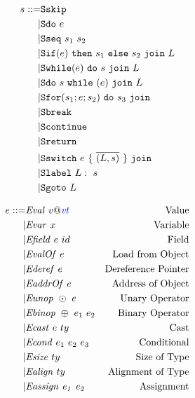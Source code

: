 \documentclass{llncs}
\begin{document}
\begin{figure}
  \begin{subfigure}[t]{0.3\textwidth}
    \[\begin{aligned}
    s ::= & \mathtt{Sskip} \\
    | & \mathtt{Sdo} ~ e \\
    | & \mathtt{Sseq} ~ s_1 ~ s_2 \\
    | & \mathtt{Sif}(e) ~ \mathtt{then} ~ s_1 ~ \mathtt{else} ~ s_2 ~ \mathtt{join} ~ L \\
    | & \mathtt{Swhile}(e) ~ \mathtt{do} ~ s ~ \mathtt{join} ~ L \\
    | & \mathtt{Sdo} ~ s ~ \mathtt{while} ~ (e) ~ \mathtt{join} ~ L \\
    | & \mathtt{Sfor}(s_1; e; s_2) ~ \mathtt{do} ~ s_3 ~ \mathtt{join} ~ \\
    | & \mathtt{Sbreak} \\
    | & \mathtt{Scontinue} \\
    | & \mathtt{Sreturn} ~ \\
    | & \mathtt{Sswitch} ~ e ~ \{ ~ \overline{(L,s)} ~ \} ~ \mathtt{join} ~ \\
    | & \mathtt{Slabel} ~ L: ~ s \\
    | & \mathtt{Sgoto} ~ L \\    
    \end{aligned}\]
  \end{subfigure}
  \begin{subfigure}[t]{0.69\textwidth}
    \[\begin{aligned}
    \expr ::= & \val{v}{\vt} & \textnormal{Value} \\
    | & \var{x} & \textnormal{Variable} \\
    | & \field{\expr}{id} & \textnormal{Field} \\
    | & \valof{\expr} & \textnormal{Load from Object} \\
    | & \deref{\expr} & \textnormal{Dereference Pointer} \\
    | & \addrof{\expr} & \textnormal{Address of Object} \\
    | & \unop{\odot}{\expr} & \textnormal{Unary Operator} \\
    | & \binop{\oplus}{\expr_1}{\expr_2} & \textnormal{Binary Operator} \\
    | & \cast{\expr}{ty} & \textnormal{Cast} \\
    | & \condition{\expr_1}{\expr_2}{\expr_3} & \textnormal{Conditional} \\
    | & \sizeof{ty} & \textnormal{Size of Type} \\
    | & \alignof{ty} & \textnormal{Alignment of Type} \\
    | & \assign{\expr_1}{\expr_2} & \textnormal{Assignment} \\

\end{aligned}\]
\end{subfigure}
\end{figure}
\end{document}
